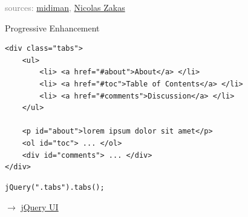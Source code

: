 \documentclass{beamer}
\begin{document}
{
  \begin{frame}
    \vspace*{6.7cm}
    \textcolor{gray}{\tiny
        sources:
        \href{http://www.flickr.com/photos/midiman/336647596}{midiman},
        \href{http://www.slideshare.net/nzakas/progressive-enhancement-20-conference-agnostic}{Nicolas Zakas}
    }
  \end{frame}
}

\begin{frame}[fragile]{Progressive Enhancement}

  \begin{verbatim}
<div class="tabs">
    <ul>
        <li> <a href="#about">About</a> </li>
        <li> <a href="#toc">Table of Contents</a> </li>
        <li> <a href="#comments">Discussion</a> </li>
    </ul>

    <p id="about">lorem ipsum dolor sit amet</p>
    <ol id="toc"> ... </ol>
    <div id="comments"> ... </div>
</div>
  \end{verbatim}
  \begin{verbatim}
jQuery(".tabs").tabs();
  \end{verbatim}

  \tiny \ensuremath{\rightarrow} \href{http://jqueryui.com/tabs/}{jQuery UI}
\end{frame}
\end{document}
